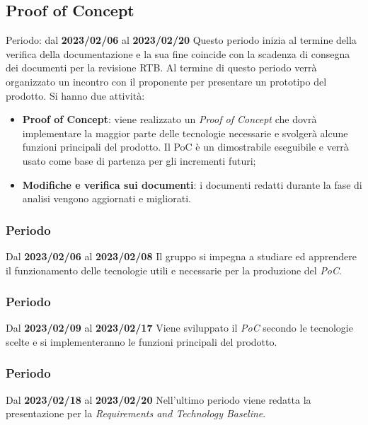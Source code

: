 \subsection{Proof of Concept}
Periodo: dal \textbf{2023/02/06} al \textbf{2023/02/20} \newline
Questo periodo inizia al termine della verifica della documentazione e la sua fine coincide con la scadenza
di consegna dei documenti per la revisione RTB\glo.
Al termine di questo periodo verrà organizzato un incontro con il proponente per presentare un prototipo del prodotto.\newline
Si hanno due attività:
\begin{itemize}
    \item \textbf{Proof of Concept}: viene realizzato un \textit{Proof of Concept} che dovrà implementare la maggior
          parte delle tecnologie necessarie e svolgerà alcune funzioni principali del prodotto. Il PoC è un dimostrabile eseguibile
          e verrà usato come base di partenza per gli incrementi futuri;
    \item \textbf{Modifiche e verifica sui documenti}: i documenti redatti durante la fase di analisi vengono aggiornati e migliorati.
\end{itemize}
\subsubsection{ Periodo}
Dal \textbf{2023/02/06} al \textbf{2023/02/08}
\newline
Il gruppo si impegna a studiare ed apprendere il funzionamento delle tecnologie utili e necessarie per la produzione del \textit{PoC}.

\subsubsection{ Periodo}
Dal \textbf{2023/02/09} al \textbf{2023/02/17}
\newline
Viene sviluppato il \textit{PoC} secondo le tecnologie scelte e si implementeranno le funzioni principali del prodotto.

\subsubsection{ Periodo}
Dal \textbf{2023/02/18} al \textbf{2023/02/20}
\newline
Nell'ultimo periodo viene redatta la presentazione per la \textit{Requirements and Technology Baseline}.

